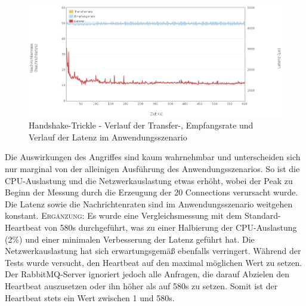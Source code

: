 \documentclass[	a4paper,
			11pt,
			oneside,
			parskip]{scrartcl}
\begin{document}
		\begin{figure}[!htb]
			\centering
			\includegraphics[width=\textwidth]{img/handshake/handshake_scenario.png}
			\caption{Handshake-Trickle - Verlauf der Transfer-, Empfangsrate und Verlauf der Latenz im Anwendungsszenario}
			\label{fig:handshake-scenario}
		\end{figure}
	
	
	\clearpage
		{%
		  \newline
		  \newline
		  \newline
		}{%
		 Die Auswirkungen des Angriffes sind kaum wahrnehmbar und unterscheiden sich nur marginal von der alleinigen Ausführung des Anwendungsszenarios. So ist die CPU-Auslastung und
		 die Netzwerkauslastung etwas erhöht, wobei der Peak zu Beginn der Messung durch die Erzeugung der 20 Connections verursacht wurde. Die Latenz sowie die Nachrichtenraten sind im
		 Anwendungsszenario weitgehen konstant. \medskip\newline
		 \textsc{Ergänzung:} Es wurde eine Vergleichsmessung mit dem Standard-Heartbeat von 580s durchgeführt, was zu einer Halbierung der CPU-Auslastung (2\%) und einer minimalen
		 Verbesserung der Latenz geführt hat. Die Netzwerkauslastung hat sich erwartungsgemäß ebenfalls verringert. 
		}{%
		 Während der Tests wurde versucht, den Heartbeat auf den maximal möglichen Wert zu setzen. Der RabbitMQ-Server ignoriert jedoch alle Anfragen, die darauf Abzielen den Heartbeat auszusetzen oder ihn
		 höher als auf 580s zu setzen. Somit ist der Heartbeat stets ein Wert zwischen 1 und 580s.
		}
		
\end{document}
